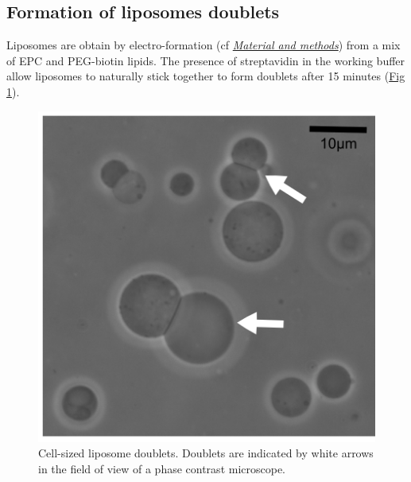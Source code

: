 \documentclass[A4paperpaper,11pt,english]{sphinxmanual}
\begin{document}
\subsection{Formation of liposomes doublets}
\label{parts/part4:formation-of-liposomes-doublets}
Liposomes are obtain by electro-formation (cf {\hyperref[parts/part2:electroformation]{\emph{Material and methods}}}) from a mix of EPC and PEG-biotin lipids. The presence of
streptavidin in the working buffer allow liposomes to naturally stick together
to form doublets after 15 minutes (\hyperref[parts/part4:fig1a]{Fig  \ref*{parts/part4:fig1a}}).
\begin{figure}[htbp]
\centering
\capstart

\includegraphics[width=0.500\linewidth]{Fig_01-A.png}
\caption{Cell-sized liposome doublets. Doublets are indicated by white arrows in
the field of view of a phase contrast microscope.}\label{parts/part4:fig1a}\end{figure}
\end{document}
